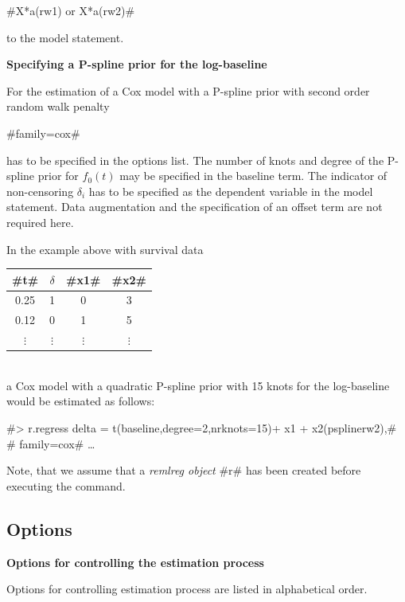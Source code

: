 #X*a(rw1) or X*a(rw2)#

to the model statement.

\textbf{Specifying a P-spline prior for the log-baseline}

For the estimation of a Cox model with a P-spline prior with
second order random walk penalty

#family=cox#

has to be specified in the options list. The number of knots and
degree of the P-spline prior for $f_0(t)$ may be specified in the
baseline term. The indicator of non-censoring $\delta_i$ has to be
specified as the dependent variable in the model statement. Data
augmentation and the specification of an offset term are not
required here.

In the example above with survival data

\vspace{0.5cm}

\begin{tabular}{c|c|c|c}
  #t# &   $\delta$ &  #x1# &  #x2#\\\hline\hline
0.25  &  1  &    0  &  3\\\hline 0.12  &  0  &    1  &  5\\\hline
$\vdots$ & $\vdots$ & $\vdots$ & $\vdots$ \\
\end{tabular}
\vspace{0.5cm}\\
a Cox model with a quadratic P-spline prior with 15 knots for the
log-baseline would be estimated as follows:

 #> r.regress delta = t(baseline,degree=2,nrknots=15)+ x1 + x2(psplinerw2),#\\
 #  family=cox# \ldots

Note, that we assume that a {\em remlreg object} #r# has been
created before executing the command.

\subsection{Options}
\label{remlregregressoptions}

\vspace{0.4cm}

{\bf Options for controlling the estimation process}
\label{remlest_options}

Options for controlling estimation process are listed in
alphabetical order.

